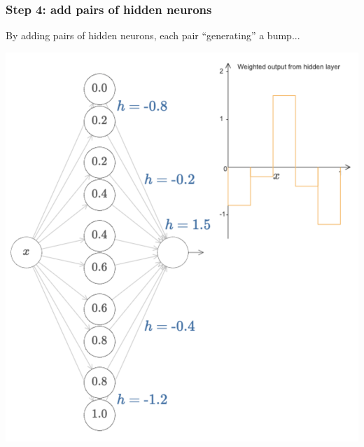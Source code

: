 \documentclass[usenames,dvipsnames]{beamer}
\begin{document}

\begin{frame}
  \frametitle{Step 4: add pairs of hidden neurons}
  
  By adding pairs of hidden neurons, each pair ``generating'' a bump...
  
  \vfill
  
    \centering
  \includegraphics[scale=.35]{more-neurons} 
  
\end{frame}
\end{document}
